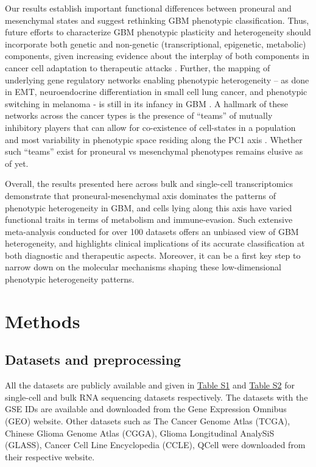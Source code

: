 \documentclass[11pt,a4paper]{article}
\begin{document}
Our results establish important functional differences between proneural and mesenchymal states and suggest rethinking GBM phenotypic classification. Thus, future efforts to characterize GBM phenotypic plasticity and heterogeneity should incorporate both genetic and non-genetic (transcriptional, epigenetic, metabolic) components, given increasing evidence about the interplay of both components in cancer cell adaptation to therapeutic attacks \parencite{drugpheno, druggennongen, garofano}. Further, the mapping of underlying gene regulatory networks enabling phenotypic heterogeneity – as done in EMT, neuroendocrine differentiation in small cell lung cancer, and phenotypic switching in melanoma \parencite{combiemt, mirnaemt, sclctfn, sclchybrid, melanomagrn} - is still in its infancy in GBM \parencite{gbmgrntmz, gbmgrn}. A hallmark of these networks across the cancer types is the presence of “teams” of mutually inhibitory players that can allow for co-existence of cell-states in a population and most variability in phenotypic space residing along the PC1 axis \parencite{emtlandscape, pc1teams, topojmetric, melanomagrn}. Whether such “teams” exist for proneural vs mesenchymal phenotypes remains elusive as of yet. 

Overall, the results presented here across bulk and single-cell transcriptomics demonstrate that proneural-mesenchymal axis dominates the patterns of phenotypic heterogeneity in GBM, and cells lying along this axis have varied functional traits in terms of metabolism and immune-evasion. Such extensive meta-analysis conducted for over 100 datasets offers an unbiased view of GBM heterogeneity, and highlights clinical implications of its accurate classification at both diagnostic and therapeutic aspects. Moreover, it can be a first key step to narrow down on the molecular mechanisms shaping these low-dimensional phenotypic heterogeneity patterns. 

\section{Methods}
\subsection{Datasets and preprocessing}
All the datasets are publicly available and given in \href{file://./Supplementary/TableS1.csv}{Table S1} and \href{file://./Supplementary/TableS2.csv}{Table S2} for single-cell and bulk RNA sequencing datasets respectively. The datasets with the GSE IDs are available and downloaded from the Gene Expression Omnibus (GEO) website. Other datasets such as The Cancer Genome Atlas (TCGA), Chinese Glioma Genome Atlas (CGGA), Glioma Longitudinal AnalySiS (GLASS), Cancer Cell Line Encyclopedia (CCLE), QCell were downloaded from their respective website. 
\end{document}
